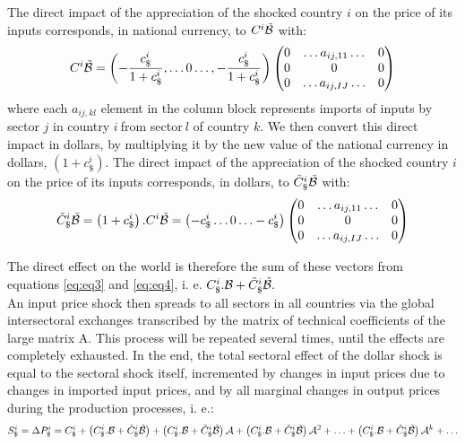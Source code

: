 \documentclass[11pt,a4paper]{article}
\begin{document}
The direct impact of the appreciation of the shocked country $i$ on the price of its inputs corresponds, in national currency, to $C^i{\tilde{{\cal B}}}$ with: 
\begin{eqnarray}
C^i{\tilde{{\cal B}}}=\left(-\frac{c_\$^i}{1+c_\$^i},\ldots0\ldots,-\frac{c_\$^i}{1+c_\$^i} \right)\left(\begin{matrix}0&\ldots{{{a}}_{ij,11}}\ldots&0\\0&0&0\\0&\ldots{{a}_{{ij,IJ}}}\ldots&0\\\end{matrix}\right) 
\label{eq:eq4}
 \end{eqnarray}
where each ${{{a}}_{{ij,kl}}}$ element in the column block represents imports of inputs by sector $j$ in country $i~$from sector$~l$ of country $k$.
We then convert this direct impact in dollars, by multiplying it by the new value of the national currency in dollars, $\left(1+c_\$^i\right)$. The direct impact of the appreciation of the shocked country $i$ on the price of its inputs corresponds, in dollars, to ${\tilde{C}_\$^i}{\tilde{{\cal B}}}$ with: 
\begin{eqnarray}
{\tilde{C}_\$^i}{\tilde{{\cal B}}}=\left(1+c_\$^i\right).C^i{\tilde{{\cal B}}}=
\left(-c_\$^i\ldots0\ldots-c_\$^i\right)\left(\begin{matrix}0&\ldots{{{a}}_{ij,11}}\ldots&0\\0&0&0\\0&\ldots{{a}_{{ij,IJ}}}\ldots&0\\\end{matrix}\right) 
\label{eq:eq4}
 \end{eqnarray}







The direct effect on the world is therefore the sum of these vectors from equations  \ref{eq:eq3} and \ref{eq:eq4}, i. e. $C_\$^i.{\cal B}+{\tilde{C}_\$^i}{\tilde{{\cal B}}}.~$\\
An input price shock then spreads to all sectors in all countries via the global intersectoral exchanges transcribed by the matrix of technical coefficients of the large matrix {\cal A}. This process will be repeated several times, until the effects are completely exhausted.
In the end, the total sectoral effect of the dollar shock is equal to the sectoral shock itself, incremented by changes in input prices due to changes in imported input prices, and by all marginal changes in output prices during the production processes, i. e.:\\
\begin{eqnarray*}
S_\$^i=\Delta{{P}_{\$}^i}=C_\$^i+ \left(C_\$^i.{\cal B}+{\tilde{C}_\$^i}{\tilde{{\cal B}}}\right)+ \left(C_\$^i.{\cal B}+{\tilde{C}_\$^i}{\tilde{{\cal B}}}\right){{\cal A}}+\left(C_\$^i.{\cal B}+{\tilde{C}_\$^i}{\tilde{{\cal B}}}\right){{\cal A}^{2}}+\ldots+\left(C_\$^i.{\cal B}+{\tilde{C}_\$^i}{\tilde{{\cal B}}}\right){\cal A}^k +\ldots \\
\end{eqnarray*}
\end{document}
